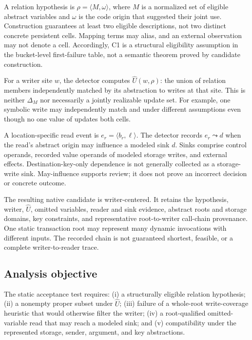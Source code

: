 A relation hypothesis is \(\rho=\langle M,\omega\rangle\), where \(M\) is a normalized set of eligible abstract variables and \(\omega\) is the code origin that suggested their joint use. Construction guarantees at least two eligible descriptions, not two distinct concrete persistent cells. Mapping terms may alias, and an external observation may not denote a cell. Accordingly, C1 is a structural eligibility assumption in the bucket-level first-failure table, not a semantic theorem proved by candidate construction.

For a writer site \(w\), the detector computes \(\widehat{U}(w,\rho)\): the union of relation members independently matched by its abstraction to writes at that site. This is neither \(\Delta_M\) nor necessarily a jointly realizable update set. For example, one symbolic write  may independently match  and  under different assumptions even though no one value of  updates both cells.

A location-specific read event is \(e_r=\langle b_r,\ell\rangle\). The detector records \(e_r\leadsto d\) when the read's abstract origin may influence a modeled sink \(d\). Sinks comprise control operands, recorded value operands of modeled storage writes, and external effects. Destination-key-only dependence is not generally collected as a storage-write sink. May-influence supports review; it does not prove an incorrect decision or concrete outcome.

The resulting native candidate is writer-centered. It retains the hypothesis, writer, \(\widehat{U}\), omitted variables, reader and sink evidence, abstract roots and storage domains, key constraints, and representative root-to-writer call-chain provenance. One static transaction root may represent many dynamic invocations with different inputs. The recorded chain is not guaranteed shortest, feasible, or a complete writer-to-reader trace.

\subsection{Analysis objective}
\label{s:analysis-objective}

The static acceptance test requires: (i) a structurally eligible relation hypothesis; (ii) a nonempty proper subset under \(\widehat{U}\); (iii) failure of a whole-root write-coverage heuristic that would otherwise filter the writer; (iv) a root-qualified omitted-variable read that may reach a modeled sink; and (v) compatibility under the represented storage, sender, argument, and key abstractions.

